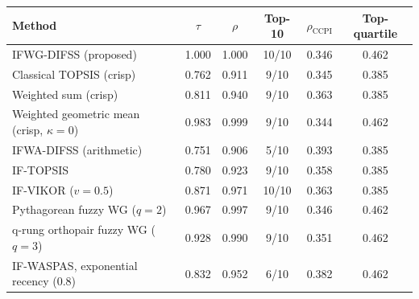 \begin{tabular}{lccccc}
\toprule
Method & $\tau$ & $\rho$ & Top-10 & $\rho_{\mathrm{CCPI}}$ & Top-quartile \\
\midrule
IFWG-DIFSS (proposed) & 1.000 & 1.000 & 10/10 & 0.346 & 0.462 \\
Classical TOPSIS (crisp) & 0.762 & 0.911 & 9/10 & 0.345 & 0.385 \\
Weighted sum (crisp) & 0.811 & 0.940 & 9/10 & 0.363 & 0.385 \\
Weighted geometric mean (crisp, $\kappa=0$) & 0.983 & 0.999 & 9/10 & 0.344 & 0.462 \\
IFWA-DIFSS (arithmetic) & 0.751 & 0.906 & 5/10 & 0.393 & 0.385 \\
IF-TOPSIS & 0.780 & 0.923 & 9/10 & 0.358 & 0.385 \\
IF-VIKOR ($v=0.5$) & 0.871 & 0.971 & 10/10 & 0.363 & 0.385 \\
Pythagorean fuzzy WG ($q=2$) & 0.967 & 0.997 & 9/10 & 0.346 & 0.462 \\
q-rung orthopair fuzzy WG ($q=3$) & 0.928 & 0.990 & 9/10 & 0.351 & 0.462 \\
IF-WASPAS, exponential recency (0.8) & 0.832 & 0.952 & 6/10 & 0.382 & 0.462 \\
\bottomrule
\end{tabular}
